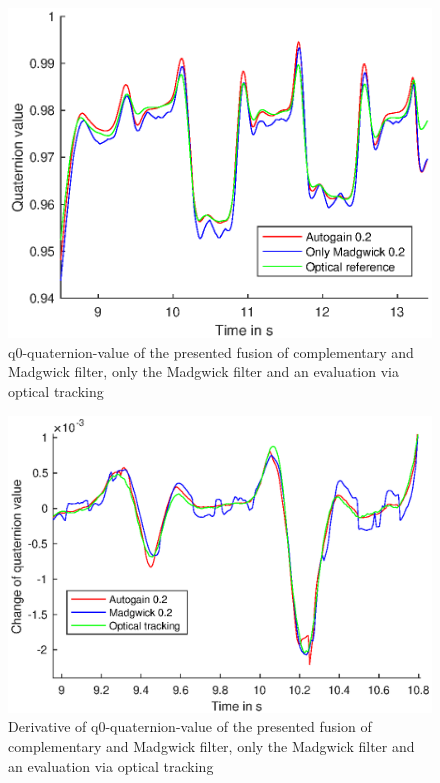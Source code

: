 \documentclass[letterpaper, 10 pt, conference]{ieeeconf}  %
\begin{document}
\begin{figure}
\includegraphics[width=\linewidth]{./graphics/opticalOrientation.eps}
\caption{q0-quaternion-value of the presented fusion of complementary and Madgwick filter, only the Madgwick filter and an evaluation via optical tracking }
\label{quaternionq0}
\end{figure}

\begin{figure}
\includegraphics[width=\linewidth]{./graphics/derivative.eps}
\caption{Derivative of q0-quaternion-value of the presented fusion of complementary and Madgwick filter, only the Madgwick filter and an evaluation via optical tracking }
\label{derivative}
\end{figure}
\end{document}

